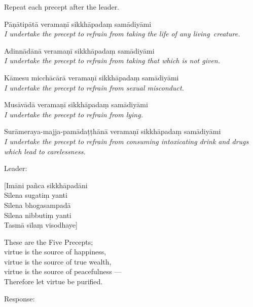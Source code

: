 \begin{instruction}
  Repeat each precept after the leader.
\end{instruction}

{\raggedright

\begin{packedenumerate}
  \item Pāṇātipātā veramaṇī sikkhāpadaṃ samādiyāmi\\
    \emph{I undertake the precept to refrain from taking the life of any living~creature.}
  \item Adinnādānā veramaṇī sikkhāpadaṃ samādiyāmi\\
    \emph{I undertake the precept to refrain from taking that which is not given.}
  \item Kāmesu micchācārā veramaṇī sikkhāpadaṃ samādiyāmi\\
    \emph{I undertake the precept to refrain from sexual misconduct.}
  \item Musāvādā veramaṇī sikkhāpadaṃ samādiyāmi\\
    \emph{I undertake the precept to refrain from lying.}
  \item Surāmeraya-majja-pamādaṭṭhānā veramaṇī sikkhāpadaṃ samādiyāmi\\
    \emph{I undertake the precept to refrain from consuming intoxicating drink and drugs which lead to carelessness.}
\end{packedenumerate}

}

\begin{instruction}
  Leader:
\end{instruction}

[Imāni pañca sikkhāpadāni\\
Sīlena sugatiṃ yanti\\
Sīlena bhogasampadā\\
Sīlena nibbutiṃ yanti\\
Tasmā sīlaṃ visodhaye]

\begin{english}
  These are the Five Precepts;\\
  virtue is the source of happiness,\\
  virtue is the source of true wealth,\\
  virtue is the source of peacefulness ---\\
  Therefore let virtue be purified.
\end{english}

\begin{instruction}
  Response:
\end{instruction}

